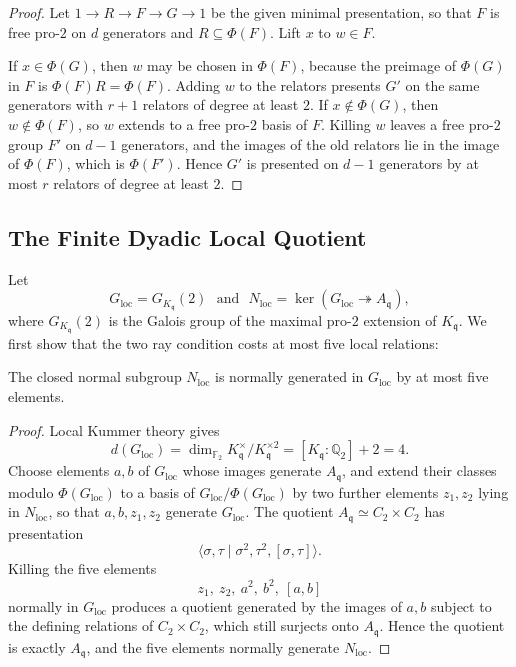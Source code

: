 \begin{proof}
Let $1\to R\to F\to G\to1$ be the given minimal presentation, so that $F$ is free pro-$2$ on $d$ generators and $R\subseteq\Phi(F)$.  Lift $x$ to $w\in F$.

If $x\in\Phi(G)$, then $w$ may be chosen in $\Phi(F)$, because the preimage of $\Phi(G)$ in $F$ is $\Phi(F)R=\Phi(F)$.  Adding $w$ to the relators presents $G'$ on the same generators with $r+1$ relators of degree at least $2$.  If $x\notin\Phi(G)$, then $w\notin\Phi(F)$, so $w$ extends to a free pro-$2$ basis of $F$.  Killing $w$ leaves a free pro-$2$ group $F'$ on $d-1$ generators, and the images of the old relators lie in the image of $\Phi(F)$, which is $\Phi(F')$.  Hence $G'$ is presented on $d-1$ generators by at most $r$ relators of degree at least $2$.
\end{proof}

\subsection{The Finite Dyadic Local Quotient}

Let
\[
   G_{\mathrm{loc}}=G_{K_{\mathfrak{q}}}(2)
   \ \ \ \text{and}\ \ \
   N_{\mathrm{loc}}=\ker(G_{\mathrm{loc}}\twoheadrightarrow A_{\mathfrak{q}}),
\]
where $G_{K_{\mathfrak{q}}}(2)$ is the Galois group of the maximal pro-$2$ extension of $K_{\mathfrak{q}}$.  We first show that the two ray condition costs at most five local relations:

\begin{lemma}\label{lem:five-local}
The closed normal subgroup $N_{\mathrm{loc}}$ is normally generated in $G_{\mathrm{loc}}$ by at most five elements.
\end{lemma}

\begin{proof}
Local Kummer theory gives
\[
   d(G_{\mathrm{loc}})=\dim_{\mathbb{F}_2}K_{\mathfrak{q}}^\times/K_{\mathfrak{q}}^{\times2}=[K_{\mathfrak{q}}:\mathbb{Q}_2]+2=4.
\]
Choose elements $a,b$ of $G_{\mathrm{loc}}$ whose images generate $A_{\mathfrak{q}}$, and extend their classes modulo $\Phi(G_{\mathrm{loc}})$ to a basis of $G_{\mathrm{loc}}/\Phi(G_{\mathrm{loc}})$ by two further elements $z_1,z_2$ lying in $N_{\mathrm{loc}}$, so that $a,b,z_1,z_2$ generate $G_{\mathrm{loc}}$.  The quotient $A_{\mathfrak{q}}\simeq C_2\times C_2$ has presentation
\[
   \langle \sigma,\tau\mid \sigma^2,\tau^2,[\sigma,\tau]\rangle.
\]
Killing the five elements
\[
   z_1,\ z_2,\ a^2,\ b^2,\ [a,b]
\]
normally in $G_{\mathrm{loc}}$ produces a quotient generated by the images of $a,b$ subject to the defining relations of $C_2\times C_2$, which still surjects onto $A_{\mathfrak{q}}$.  Hence the quotient is exactly $A_{\mathfrak{q}}$, and the five elements normally generate $N_{\mathrm{loc}}$.
\end{proof}


